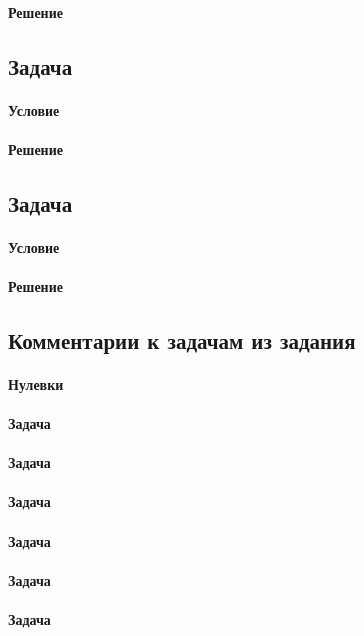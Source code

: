 \documentclass[12pt]{article}
\begin{document}
\paragraph{Решение}

\subsection{Задача}
\label{task_}
\paragraph{Условие}
\paragraph{Решение}

\subsection{Задача}
\label{task_}
\paragraph{Условие}
\paragraph{Решение}

\subsection{Комментарии к задачам из задания}
\paragraph{Нулевки} 
\paragraph{Задача } 
\paragraph{Задача } 
\paragraph{Задача }
\paragraph{Задача }
\paragraph{Задача }
\paragraph{Задача }
\end{document}
